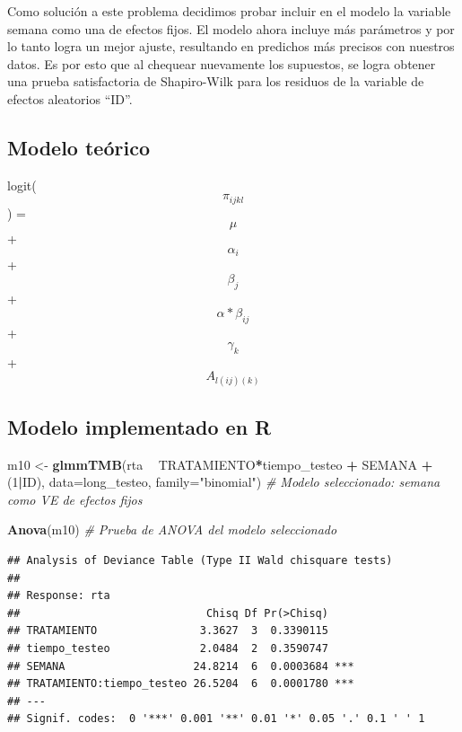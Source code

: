 \documentclass[]{article}
\newenvironment{Shaded}{\begin{snugshade}}{\end{snugshade}}
\newcommand{\CommentTok}[1]{\textcolor[rgb]{0.56,0.35,0.01}{\textit{#1}}}
\newcommand{\DataTypeTok}[1]{\textcolor[rgb]{0.13,0.29,0.53}{#1}}
\newcommand{\DecValTok}[1]{\textcolor[rgb]{0.00,0.00,0.81}{#1}}
\newcommand{\KeywordTok}[1]{\textcolor[rgb]{0.13,0.29,0.53}{\textbf{#1}}}
\newcommand{\NormalTok}[1]{#1}
\newcommand{\OperatorTok}[1]{\textcolor[rgb]{0.81,0.36,0.00}{\textbf{#1}}}
\newcommand{\StringTok}[1]{\textcolor[rgb]{0.31,0.60,0.02}{#1}}
\begin{document}
Como solución a este problema decidimos probar incluir en el modelo la
variable semana como una de efectos fijos. El modelo ahora incluye más
parámetros y por lo tanto logra un mejor ajuste, resultando en predichos
más precisos con nuestros datos. Es por esto que al chequear nuevamente
los supuestos, se logra obtener una prueba satisfactoria de Shapiro-Wilk
para los residuos de la variable de efectos aleatorios ``ID''.

\hypertarget{modelo-teuxf3rico}{%
\subsection{Modelo teórico}\label{modelo-teuxf3rico}}

logit(\[\pi_{ijkl}\]) = \[\mu\] + \[\alpha_i\] + \[\beta_j\] +
\[\alpha*\beta_{ij}\] + \[\gamma_k\] + \[A_{l(ij)(k)}\]

\hypertarget{modelo-implementado-en-r}{%
\subsection{Modelo implementado en R}\label{modelo-implementado-en-r}}

\begin{Shaded}
\begin{Highlighting}[]
\NormalTok{m10 <-}\StringTok{ }\KeywordTok{glmmTMB}\NormalTok{(rta }\OperatorTok{~}\StringTok{ }\NormalTok{TRATAMIENTO}\OperatorTok{*}\NormalTok{tiempo_testeo }\OperatorTok{+}\StringTok{ }\NormalTok{SEMANA }\OperatorTok{+}\StringTok{ }\NormalTok{(}\DecValTok{1}\OperatorTok{|}\NormalTok{ID), }\DataTypeTok{data=}\NormalTok{long_testeo, }\DataTypeTok{family=}\StringTok{"binomial"}\NormalTok{)   }\CommentTok{# Modelo seleccionado: semana como VE de efectos fijos}

\KeywordTok{Anova}\NormalTok{(m10)   }\CommentTok{# Prueba de ANOVA del modelo seleccionado}
\end{Highlighting}
\end{Shaded}

\begin{verbatim}
## Analysis of Deviance Table (Type II Wald chisquare tests)
## 
## Response: rta
##                             Chisq Df Pr(>Chisq)    
## TRATAMIENTO                3.3627  3  0.3390115    
## tiempo_testeo              2.0484  2  0.3590747    
## SEMANA                    24.8214  6  0.0003684 ***
## TRATAMIENTO:tiempo_testeo 26.5204  6  0.0001780 ***
## ---
## Signif. codes:  0 '***' 0.001 '**' 0.01 '*' 0.05 '.' 0.1 ' ' 1
\end{verbatim}
\end{document}
